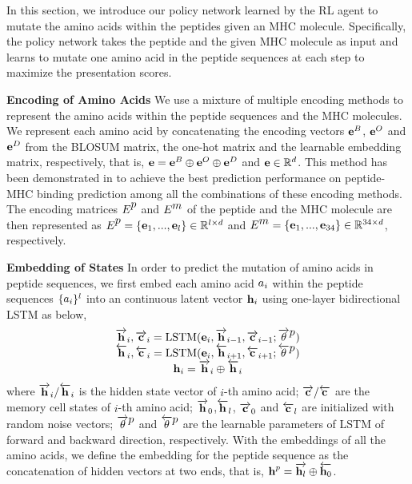 \documentclass[letterpaper]{article}
\begin{document}
In this section, we introduce our policy network learned by the RL agent to mutate the amino acids within the peptides given an 
MHC molecule.
%
Specifically, the policy network takes the peptide and the given MHC molecule as input and learns to mutate one amino acid 
in the peptide sequences at each step to maximize the presentation scores.
%

\textbf{Encoding of Amino Acids} We use a mixture of multiple encoding methods to represent the amino acids within the peptide sequences and the MHC molecules.
%
We represent each amino acid by concatenating the encoding vectors $\mbox{$\mathbf{e}$}^B$, $\mbox{$\mathbf{e}$}^O$ and $\mbox{$\mathbf{e}$}^D$ from the BLOSUM matrix, the one-hot matrix and 
the learnable embedding matrix, respectively, that is, $\mbox{$\mathbf{e}$} = \mbox{$\mathbf{e}$}^B \oplus \mbox{$\mathbf{e}$}^O \oplus \mbox{$\mathbf{e}$}^D$ and $\mbox{$\mathbf{e}$}\in\mathbb{R}^{d}$.
%
This method has been demonstrated in \cite{Chen2021} to achieve the best prediction performance on peptide-MHC binding prediction among all
the combinations of these encoding methods. 
%
The encoding matrices $E^{\mbox{$\mathop{p}$}}$ and $E^{\mbox{$\mathop{m}$}}$ of the peptide \peptide and the MHC molecule \allele are then represented as 
$E^{\mbox{$\mathop{p}$}}=\{\mbox{$\mathbf{e}$}_1,...,\mbox{$\mathbf{e}$}_l\}\in\mathbb{R}^{l\times d}$ and 
$E^{\mbox{$\mathop{m}$}}=\{\mbox{$\mathbf{e}$}_1,...,\mbox{$\mathbf{e}$}_{34}\}\in\mathbb{R}^{34\times d}$, respectively.

\textbf{Embedding of States} In order to predict the mutation of amino acids in peptide sequences, we first embed each amino acid $\mbox{$\mathop{a}$}_i$ within 
the peptide sequences $\{\mbox{$\mathop{a}$}_i\}^l$ into an continuous latent vector $\mbox{$\mathbf{h}$}_i$ using one-layer bidirectional LSTM as below,
%
\begin{equation}
\begin{array}{c}
\overrightarrow{\mbox{$\mathbf{h}$}}_i, \overrightarrow{\mbox{$\mathbf{c}$}}_i = \text{LSTM}(\mbox{$\mathbf{e}$}_i, \overrightarrow{\mbox{$\mathbf{h}$}}_{i-1}, \overrightarrow{\mbox{$\mathbf{c}$}}_{i-1}; \overrightarrow{\theta}^{\mbox{$\mathop{p}$}})\\
\overleftarrow{\mbox{$\mathbf{h}$}}_i, \overleftarrow{\mbox{$\mathbf{c}$}}_i = \text{LSTM}(\mbox{$\mathbf{e}$}_i, \overleftarrow{\mbox{$\mathbf{h}$}}_{i+1}, \overleftarrow{\mbox{$\mathbf{c}$}}_{i+1}; \overleftarrow{\theta}^{\mbox{$\mathop{p}$}})\\
\mbox{$\mathbf{h}$}_i = \overrightarrow{\mbox{$\mathbf{h}$}}_i \oplus \overleftarrow{\mbox{$\mathbf{h}$}}_i\\
\end{array}
\end{equation}
%
where $\overrightarrow{\mbox{$\mathbf{h}$}}_i/\overleftarrow{\mbox{$\mathbf{h}$}}_i$ is the hidden state vector of $i$-th amino acid; 
$\overrightarrow{\mbox{$\mathbf{c}$}}/\overleftarrow{\mbox{$\mathbf{c}$}}$ are the memory cell states of $i$-th amino acid;
$\overrightarrow{\mbox{$\mathbf{h}$}}_0$,$\overleftarrow{\mbox{$\mathbf{h}$}}_l$, $\overrightarrow{\mbox{$\mathbf{c}$}}_0$ and $\overleftarrow{\mbox{$\mathbf{c}$}}_l$ are initialized with random noise vectors;
$\overrightarrow{\theta}^{\mbox{$\mathop{p}$}}$ and $\overleftarrow{\theta}^{\mbox{$\mathop{p}$}}$ are the learnable parameters of LSTM of forward and backward direction, respectively.
%
With the embeddings of all the amino acids, we define the embedding for the peptide sequence as the concatenation of hidden vectors at two ends, 
that is, $\mbox{$\mathbf{h}$}^p = \overrightarrow{\mbox{$\mathbf{h}$}_l} \oplus \overleftarrow{\mbox{$\mathbf{h}$}_0}$.
\end{document}
